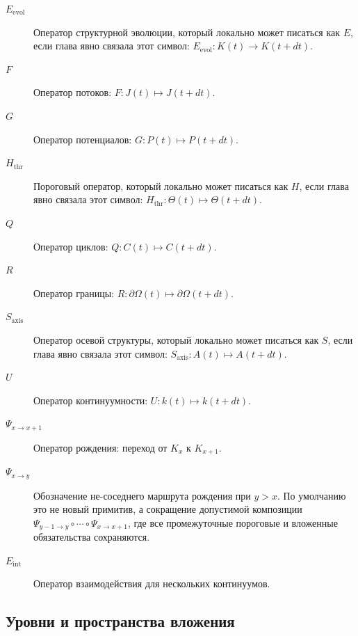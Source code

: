 \begin{description}
  \item[\(E_{\mathrm{evol}}\)] Оператор структурной эволюции, который
        локально может писаться как \(E\), если глава явно связала этот
        символ:
        \(E_{\mathrm{evol}}: K(t) \to K(t+dt)\).
  \item[\(F\)] Оператор потоков:
        \(F: J(t)\mapsto J(t+dt)\).
  \item[\(G\)] Оператор потенциалов:
        \(G: P(t)\mapsto P(t+dt)\).
  \item[\(H_{\mathrm{thr}}\)] Пороговый оператор, который локально может
        писаться как \(H\), если глава явно связала этот символ:
        \(H_{\mathrm{thr}}: \Theta(t)\mapsto \Theta(t+dt)\).
  \item[\(Q\)] Оператор циклов:
        \(Q: C(t)\mapsto C(t+dt)\).
  \item[\(R\)] Оператор границы:
        \(R: \partial\Omega(t)\mapsto \partial\Omega(t+dt)\).
  \item[\(S_{\mathrm{axis}}\)] Оператор осевой структуры, который локально
        может писаться как \(S\), если глава явно связала этот символ:
        \(S_{\mathrm{axis}}: A(t)\mapsto A(t+dt)\).
  \item[\(U\)] Оператор континуумности:
        \(U: k(t)\mapsto k(t+dt)\).
  \item[\(\Psi_{x\to x+1}\)] Оператор рождения:
        переход от \(K_x\) к \(K_{x+1}\).
  \item[\(\Psi_{x\to y}\)] Обозначение не-соседнего маршрута рождения при
        \(y>x\). По умолчанию это не новый примитив, а сокращение допустимой
        композиции \(\Psi_{y-1\to y}\circ\cdots\circ\Psi_{x\to x+1}\), где все
        промежуточные пороговые и вложенные обязательства сохраняются.
  \item[\(E_{\mathrm{int}}\)] Оператор взаимодействия для нескольких континуумов.
\end{description}

\subsection{Уровни и пространства вложения}

